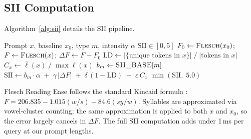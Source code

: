 \documentclass[conference]{IEEEtran}
\begin{document}
\subsection{SII Computation}
Algorithm~\ref{alg:sii} details the SII pipeline.
\begin{algorithm}[t]
\caption{Semantic Instability Index}
\label{alg:sii}
\begin{algorithmic}[1]
\REQUIRE Prompt $x$, baseline $x_0$, type $m$, intensity $\alpha$
\ENSURE $\mathrm{SII} \in [0, 5]$
\STATE $F_0 \gets \textsc{Flesch}(x_0)$;\quad
       $F   \gets \textsc{Flesch}(x)$;\quad
       $\Delta F \gets F - F_0$
\STATE $\mathrm{LD} \gets
       |\{\text{unique tokens in } x\}| \;/\; |\text{tokens in } x|$
\STATE $C_x \gets \bar{\ell}(x) \;/\; \max \ell(x)$
\STATE $b_m \gets \textsc{SII\_BASE}[m]$
\STATE $\mathrm{SII} \gets
       b_m \cdot \alpha \;+\;
       \gamma\,|\Delta F| \;+\;
       \delta\,(1 - \mathrm{LD}) \;+\;
       \varepsilon\,C_x$
\RETURN $\min(\mathrm{SII},\; 5.0)$
\end{algorithmic}
\end{algorithm}
Flesch Reading Ease follows the standard Kincaid formula
\cite{flesch1948readability}: $F = 206.835 - 1.015(w/s) - 84.6(sy/w)$.
Syllables are approximated via vowel-cluster counting; the same
approximation is applied to both $x$ and $x_0$, so the error largely
cancels in $\Delta F$. The full SII computation adds under 1\,ms per
query at our prompt lengths.
\end{document}
